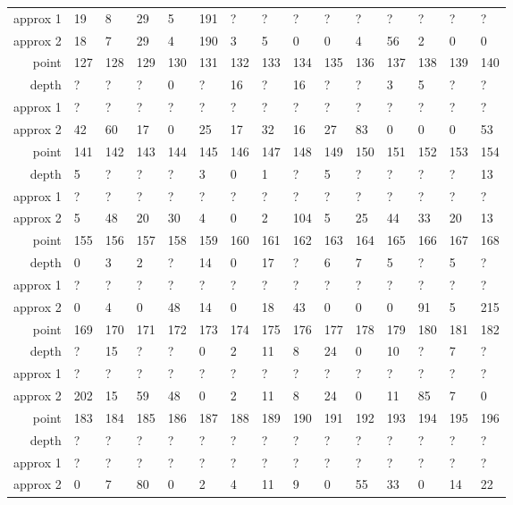 \begin{center}
\begin{supertabular}{|r|l l l l l l l l l l l l l l|}
approx 1 & 19 & 8 & 29 & 5 & 191 & ? & ? & ? & ? & ? & ? & ? & ? & ? \\
approx 2 & 18 & 7 & 29 & 4 & 190 & 3 & 5 & 0 & 0 & 4 & 56 & 2 & 0 & 0 \\
\hline
point & 127 & 128 & 129 & 130 & 131 & 132 & 133 & 134 & 135 & 136 & 137 & 138 & 139 & 140 \\
\hline
depth & ? & ? & ? & 0 & ? & 16 & ? & 16 & ? & ? & 3 & 5 & ? & ? \\
approx 1 & ? & ? & ? & ? & ? & ? & ? & ? & ? & ? & ? & ? & ? & ? \\
approx 2 & 42 & 60 & 17 & 0 & 25 & 17 & 32 & 16 & 27 & 83 & 0 & 0 & 0 & 53 \\
\hline
point & 141 & 142 & 143 & 144 & 145 & 146 & 147 & 148 & 149 & 150 & 151 & 152 & 153 & 154 \\
\hline
depth & 5 & ? & ? & ? & 3 & 0 & 1 & ? & 5 & ? & ? & ? & ? & 13 \\
approx 1 & ? & ? & ? & ? & ? & ? & ? & ? & ? & ? & ? & ? & ? & ? \\
approx 2 & 5 & 48 & 20 & 30 & 4 & 0 & 2 & 104 & 5 & 25 & 44 & 33 & 20 & 13 \\
\hline
point & 155 & 156 & 157 & 158 & 159 & 160 & 161 & 162 & 163 & 164 & 165 & 166 & 167 & 168 \\
\hline
depth & 0 & 3 & 2 & ? & 14 & 0 & 17 & ? & 6 & 7 & 5 & ? & 5 & ? \\
approx 1 & ? & ? & ? & ? & ? & ? & ? & ? & ? & ? & ? & ? & ? & ? \\
approx 2 & 0 & 4 & 0 & 48 & 14 & 0 & 18 & 43 & 0 & 0 & 0 & 91 & 5 & 215 \\
\hline
point & 169 & 170 & 171 & 172 & 173 & 174 & 175 & 176 & 177 & 178 & 179 & 180 & 181 & 182 \\
\hline
depth & ? & 15 & ? & ? & 0 & 2 & 11 & 8 & 24 & 0 & 10 & ? & 7 & ? \\
approx 1 & ? & ? & ? & ? & ? & ? & ? & ? & ? & ? & ? & ? & ? & ? \\
approx 2 & 202 & 15 & 59 & 48 & 0 & 2 & 11 & 8 & 24 & 0 & 11 & 85 & 7 & 0 \\
\hline
point & 183 & 184 & 185 & 186 & 187 & 188 & 189 & 190 & 191 & 192 & 193 & 194 & 195 & 196 \\
\hline
depth & ? & ? & ? & ? & ? & ? & ? & ? & ? & ? & ? & ? & ? & ? \\
approx 1 & ? & ? & ? & ? & ? & ? & ? & ? & ? & ? & ? & ? & ? & ? \\
approx 2 & 0 & 7 & 80 & 0 & 2 & 4 & 11 & 9 & 0 & 55 & 33 & 0 & 14 & 22 \\

\end{supertabular}
\end{center}
